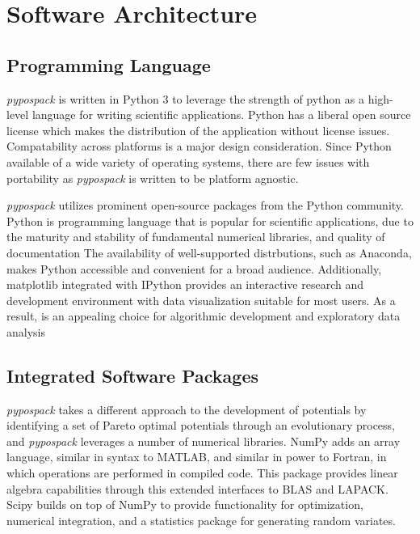 \section{Software Architecture}
\label{sec:software_architecture}

\subsection{Programming Language}
\emph{pypospack} is written in Python 3 to leverage the strength of python as a high-level language for writing scientific applications.  Python has a liberal open source license which makes the distribution of the application without license issues.  Compatability across platforms is a major design consideration.  Since Python available of a wide variety of operating systems, there are few issues with portability as \emph{pypospack} is written to be platform agnostic.

\emph{pypospack} utilizes prominent open-source packages from the Python community.  Python is programming language that is popular for scientific applications, due to the maturity and stability of fundamental numerical libraries, and quality of documentation  The availability of well-supported distrbutions, such as Anaconda\cite{python_anaconda}, makes Python accessible and convenient for a broad audience.  Additionally, matplotlib\cite{hunter2007_matplotlib} integrated with IPython\cite{} provides an interactive research and development environment with data visualization suitable for most users.  As a result, is an appealing choice for algorithmic development and exploratory data analysis\cite{dubois2007_python}

\subsection{Integrated Software Packages}

\emph{pypospack} takes a different approach to the development of potentials by identifying a set of Pareto optimal potentials through an evolutionary process, and \emph{pypospack} leverages a number of numerical libraries.  NumPy\cite{walt2011_numpy} adds an array language, similar in syntax to MATLAB, and similar in power to Fortran, in which operations are performed in compiled code.  This package provides linear algebra capabilities through this extended interfaces to BLAS\cite{blas2002} and LAPACK\cite{anderson1990_lapack}.  Scipy\cite{jones_scipy} builds on top of NumPy to provide functionality for optimization, numerical integration, and a statistics package for generating random variates.

